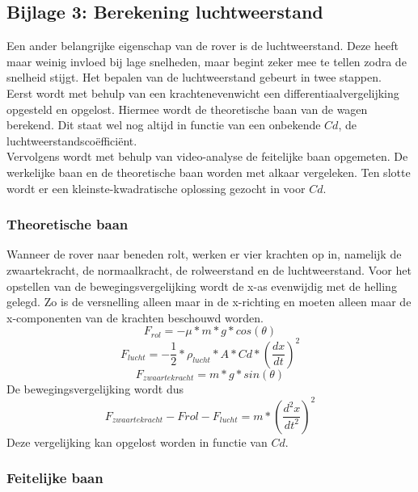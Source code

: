 \subsection{Bijlage 3: Berekening luchtweerstand}

Een ander belangrijke eigenschap van de rover is de luchtweerstand. Deze heeft maar weinig invloed bij lage snelheden, maar begint zeker mee te tellen zodra de snelheid stijgt. Het bepalen van de luchtweerstand gebeurt in twee stappen.\\
Eerst wordt met behulp van een krachtenevenwicht een differentiaalvergelijking opgesteld en opgelost. Hiermee wordt de theoretische baan van de wagen berekend. Dit staat wel nog altijd in functie van een onbekende $Cd$, de luchtweerstandsco\"effici\"ent.\\
Vervolgens wordt met behulp van video-analyse de feitelijke baan opgemeten. De werkelijke baan en de theoretische baan worden met alkaar vergeleken. Ten slotte wordt er een kleinste-kwadratische oplossing gezocht in voor $Cd$.\\

\subsubsection{Theoretische baan}
Wanneer de rover naar beneden rolt, werken er vier krachten op in, namelijk de zwaartekracht, de normaalkracht, de rolweerstand en de luchtweerstand. Voor het opstellen van de bewegingsvergelijking wordt de x-as evenwijdig met de helling gelegd. Zo is de versnelling alleen maar in de x-richting en moeten alleen maar de x-componenten van de krachten beschouwd worden.
\begin{equation} \label{eq:rolweerstand}
F_{rol}=-\mu*m*g*cos(\theta)
\end{equation}
\begin{equation} \label{eq:luchtweerstand}
F_{lucht}=-\frac{1}{2}*\rho_{lucht}*A*Cd*\left(\frac{dx}{dt}\right)^2
\end{equation}
\begin{equation} \label{eq:zwaartekracht}
F_{zwaartekracht}=m*g*sin(\theta)
\end{equation}
De bewegingsvergelijking wordt dus
\begin{equation}
F_{zwaartekracht} - F{rol}-F_{lucht}=m*\left(\frac{d^2x}{dt^2}\right)^2
\end{equation}
Deze vergelijking kan opgelost worden in functie van $Cd$.
\subsubsection{Feitelijke baan}
